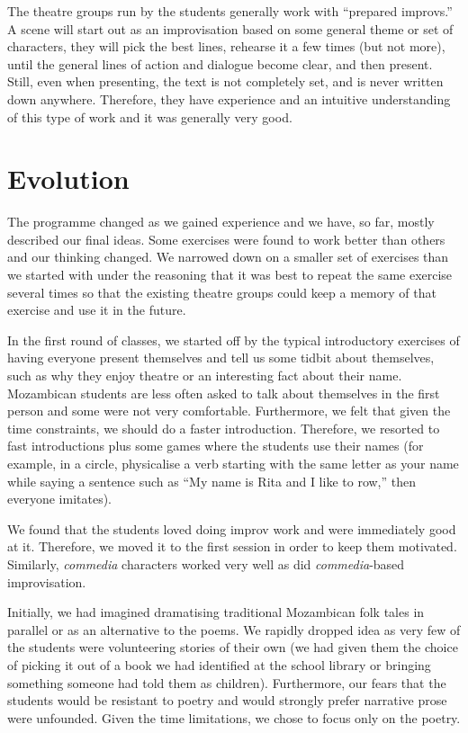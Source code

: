 \documentclass[article,twocolumn,twoside]{memoir}
\begin{document}
The theatre groups run by the students generally work with ``prepared
improvs.'' A scene will start out as an improvisation based on some general
theme or set of characters, they will pick the best lines, rehearse it a few
times (but not more), until the general lines of action and dialogue become
clear, and then present. Still, even when presenting, the text is not
completely set, and is never written down anywhere. Therefore, they have
experience and an intuitive understanding of this type of work and it was
generally very good.

\chapter{Evolution}

The programme changed as we gained experience and we have, so far, mostly
described our final ideas. Some exercises were found to work better than others
and our thinking changed. We narrowed down on a smaller set of exercises than
we started with under the reasoning that it was best to repeat the same
exercise several times so that the existing theatre groups could keep a memory
of that exercise and use it in the future.

In the first round of classes, we started off by the typical introductory
exercises of having everyone present themselves and tell us some tidbit about
themselves, such as why they enjoy theatre or an interesting fact about their
name. Mozambican students are less often asked to talk about themselves in the
first person and some were not very comfortable. Furthermore, we felt that
given the time constraints, we should do a faster introduction. Therefore, we
resorted to fast introductions plus some games where the students use their
names (for example, in a circle, physicalise a verb starting with the same
letter as your name while saying a sentence such as ``My name is Rita and I
like to row,'' then everyone imitates).

We found that the students loved doing improv work and were immediately
good at it. Therefore, we moved it to the first session in order to keep them
motivated. Similarly, \textit{commedia} characters worked very well as did
\textit{commedia}-based improvisation.

Initially, we had imagined dramatising traditional Mozambican folk tales in
parallel or as an alternative to the poems. We rapidly dropped idea as very
few of the students were volunteering stories of their own (we had given them
the choice of picking it out of a book we had identified at the school library
or bringing something someone had told them as children). Furthermore, our
fears that the students would be resistant to poetry and would strongly prefer
narrative prose were unfounded. Given the time limitations, we chose to focus
only on the poetry.
\end{document}

